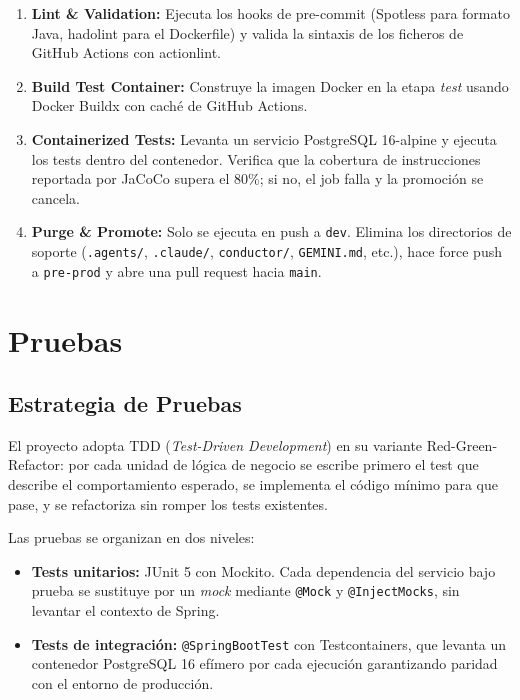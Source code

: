 \documentclass[12pt, a4paper]{report}
\begin{document}
\begin{enumerate}
  \item \textbf{Lint \& Validation:} Ejecuta los hooks de pre-commit (Spotless
        para formato Java, hadolint para el Dockerfile) y valida la sintaxis de
        los ficheros de GitHub Actions con actionlint.
  \item \textbf{Build Test Container:} Construye la imagen Docker en la etapa
        \textit{test} usando Docker Buildx con caché de GitHub Actions.
  \item \textbf{Containerized Tests:} Levanta un servicio PostgreSQL 16-alpine y
        ejecuta los tests dentro del contenedor. Verifica que la cobertura de
        instrucciones reportada por JaCoCo supera el 80\%; si no, el job falla y
        la promoción se cancela.
  \item \textbf{Purge \& Promote:} Solo se ejecuta en push a \texttt{dev}.
        Elimina los directorios de soporte (\texttt{.agents/}, \texttt{.claude/},
        \texttt{conductor/}, \texttt{GEMINI.md}, etc.), hace force push a
        \texttt{pre-prod} y abre una pull request hacia \texttt{main}.
\end{enumerate}

\chapter{Pruebas}

\section{Estrategia de Pruebas}

El proyecto adopta TDD (\textit{Test-Driven Development}) en su variante
Red-Green-Refactor: por cada unidad de lógica de negocio se escribe primero el
test que describe el comportamiento esperado, se implementa el código mínimo para
que pase, y se refactoriza sin romper los tests existentes.

Las pruebas se organizan en dos niveles:

\begin{itemize}
  \item \textbf{Tests unitarios:} JUnit 5 con Mockito. Cada dependencia del
        servicio bajo prueba se sustituye por un \textit{mock} mediante
        \texttt{@Mock} y \texttt{@InjectMocks}, sin levantar el contexto de
        Spring.
  \item \textbf{Tests de integración:} \texttt{@SpringBootTest} con
        Testcontainers, que levanta un contenedor PostgreSQL 16 efímero por
        cada ejecución garantizando paridad con el entorno de producción.
\end{itemize}
\end{document}
